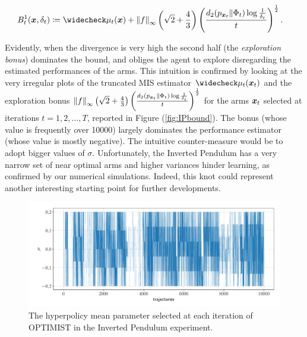 \begin{align}
	&B_t^{1}(\vx,\delta_t) \coloneqq 
	\wc{\mu}_t(\vx)+\norm[\infty]{f}\left(\sqrt{2}+\frac{4}{3}\right)\left(\frac{d_{2}(p_{\vx_t}\|\Phi_{t})\log\frac{1}{\delta_t}}{t}\right)^{\frac{1}{2}}.
\end{align}

Evidently, when the \Renyi divergence is very high the second half (the \emph{exploration bonus}) dominates the bound, and obliges the agent to explore disregarding the estimated performances of the arms. This intuition is confirmed by looking at the very irregular plots of the truncated \gls{MIS} estimator $\wc{\mu}_t(\vx_t)$ and the exploration bonus $\norm[\infty]{f}\left(\sqrt{2}+\frac{4}{3}\right)\left(\frac{d_{2}(p_{\vx_t}\|\Phi_{t})\log\frac{1}{\delta_t}}{t}\right)^{\frac{1}{2}}$ for the arms $\vx_t$ selected at iterations $t=1,2,\dots,T$, reported in Figure (\ref{fig:IPbound}). The bonus (whose value is frequently over 10000) largely dominates the performance estimator (whose value is mostly negative). The intuitive counter-measure would be to adopt bigger values of $\sigma$. Unfortunately, the Inverted Pendulum has a very narrow set of near optimal arms and higher variances hinder learning, as confirmed by our numerical simulations. Indeed, this knot could represent another interesting starting point for further developments.

\begin{figure}[t!] 
\centering
\includegraphics[width=\textwidth,keepaspectratio]{Images/IP_mu_1.pdf}
\caption{The hyperpolicy mean parameter selected at each iteration of \gls{OPTIMIST} in the Inverted Pendulum experiment.} 
\label{fig:IPmu1}
\end{figure}


